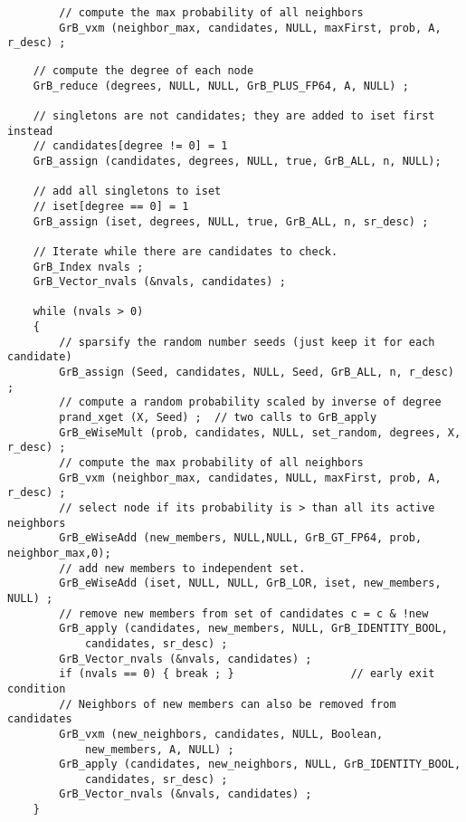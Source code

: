 \documentclass[12pt]{article}
\begin{document}
        {\footnotesize
        \begin{verbatim}
        // compute the max probability of all neighbors
        GrB_vxm (neighbor_max, candidates, NULL, maxFirst, prob, A, r_desc) ; \end{verbatim}}

\newpage
\begin{mdframed}[userdefinedwidth=6in]
{\footnotesize
\begin{verbatim}
    // compute the degree of each node
    GrB_reduce (degrees, NULL, NULL, GrB_PLUS_FP64, A, NULL) ;

    // singletons are not candidates; they are added to iset first instead
    // candidates[degree != 0] = 1
    GrB_assign (candidates, degrees, NULL, true, GrB_ALL, n, NULL);

    // add all singletons to iset
    // iset[degree == 0] = 1
    GrB_assign (iset, degrees, NULL, true, GrB_ALL, n, sr_desc) ;

    // Iterate while there are candidates to check.
    GrB_Index nvals ;
    GrB_Vector_nvals (&nvals, candidates) ;

    while (nvals > 0)
    {
        // sparsify the random number seeds (just keep it for each candidate)
        GrB_assign (Seed, candidates, NULL, Seed, GrB_ALL, n, r_desc) ;
        // compute a random probability scaled by inverse of degree
        prand_xget (X, Seed) ;  // two calls to GrB_apply
        GrB_eWiseMult (prob, candidates, NULL, set_random, degrees, X, r_desc) ;
        // compute the max probability of all neighbors
        GrB_vxm (neighbor_max, candidates, NULL, maxFirst, prob, A, r_desc) ;
        // select node if its probability is > than all its active neighbors
        GrB_eWiseAdd (new_members, NULL,NULL, GrB_GT_FP64, prob, neighbor_max,0);
        // add new members to independent set.
        GrB_eWiseAdd (iset, NULL, NULL, GrB_LOR, iset, new_members, NULL) ;
        // remove new members from set of candidates c = c & !new
        GrB_apply (candidates, new_members, NULL, GrB_IDENTITY_BOOL,
            candidates, sr_desc) ;
        GrB_Vector_nvals (&nvals, candidates) ;
        if (nvals == 0) { break ; }                  // early exit condition
        // Neighbors of new members can also be removed from candidates
        GrB_vxm (new_neighbors, candidates, NULL, Boolean,
            new_members, A, NULL) ;
        GrB_apply (candidates, new_neighbors, NULL, GrB_IDENTITY_BOOL,
            candidates, sr_desc) ;
        GrB_Vector_nvals (&nvals, candidates) ;
    }
\end{verbatim}}
\end{mdframed}
\end{document}
